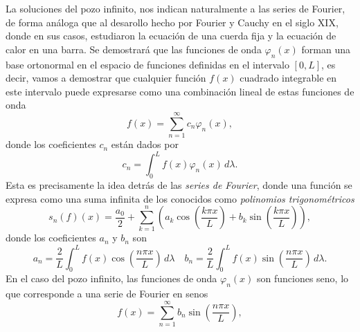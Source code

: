 \documentclass[main.tex]{subfiles}
\begin{document}
La soluciones del pozo infinito, nos indican naturalmente a las series de Fourier, de forma análoga que al desarollo hecho por Fourier y Cauchy en el siglo XIX, donde en sus casos, estudiaron la ecuación de una cuerda fija y la ecuación de calor en una barra. Se demostrará que las funciones de onda \(\varphi_n(x)\) forman una base ortonormal en el espacio de funciones definidas en el intervalo \([0, L]\), es decir, vamos a demostrar que cualquier función \(f(x)\) cuadrado integrable en este intervalo puede expresarse como una combinación lineal de estas funciones de onda
\[
f(x) = \sum_{n=1}^\infty c_n \varphi_n(x),
\]
donde los coeficientes \(c_n\) están dados por
\[
c_n = \int_0^L f(x) \varphi_n(x) \, d\lambda.
\]
Esta es precisamente la idea detrás de las \emph{series de Fourier}, donde una función se expresa como una suma infinita de los conocidos como \emph{polinomios trigonométricos}
\[
s_n(f)(x)=\frac{a_0}{2}+\sum_{k=1}^n\left(a_k\cos\left(\frac{k\pi x}{L}\right)+ b_k\sin\left(\frac{k\pi x}{L}\right)\right),
\]
donde los coeficientes \(a_n\) y \(b_n\) son
\[
  a_n = \frac{2}{L} \int_0^L f(x) \cos\left(\frac{n\pi x}{L}\right) \, d\lambda\quad b_n = \frac{2}{L} \int_0^L f(x) \sin\left(\frac{n\pi x}{L}\right) \, d\lambda.
\]
\obs En el caso del pozo infinito, las funciones de onda \(\varphi_n(x)\) son funciones seno, lo que corresponde a una serie de Fourier en senos
\[
f(x) = \sum_{n=1}^\infty b_n \sin\left(\frac{n\pi x}{L}\right),
\]
\end{document}
